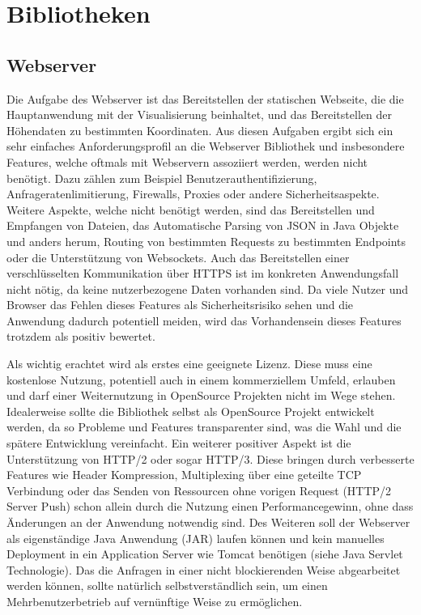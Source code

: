 
\section{Bibliotheken}

\subsection{Webserver}
Die Aufgabe des Webserver ist das Bereitstellen der statischen Webseite, die die Hauptanwendung mit der Visualisierung beinhaltet, und das Bereitstellen der Höhendaten zu bestimmten Koordinaten. Aus diesen Aufgaben ergibt sich ein sehr einfaches Anforderungsprofil an die Webserver Bibliothek und insbesondere Features, welche oftmals mit Webservern assoziiert werden, werden nicht benötigt. Dazu zählen zum Beispiel Benutzerauthentifizierung, Anfrageratenlimitierung, Firewalls, Proxies oder andere Sicherheitsaspekte. Weitere Aspekte, welche nicht benötigt werden, sind das Bereitstellen und Empfangen von Dateien, das Automatische Parsing von JSON in Java Objekte und anders herum, Routing von bestimmten Requests zu bestimmten Endpoints oder die Unterstützung von Websockets. Auch das Bereitstellen einer verschlüsselten Kommunikation über HTTPS ist im konkreten Anwendungsfall nicht nötig, da keine nutzerbezogene Daten vorhanden sind. Da viele Nutzer und Browser das Fehlen dieses Features als Sicherheitsrisiko sehen und die Anwendung dadurch potentiell meiden, wird das Vorhandensein dieses Features trotzdem als positiv bewertet.

Als wichtig erachtet wird als erstes eine geeignete Lizenz. Diese muss eine kostenlose Nutzung, potentiell auch in einem kommerziellem Umfeld, erlauben und darf einer Weiternutzung in OpenSource Projekten nicht im Wege stehen. Idealerweise sollte die Bibliothek selbst als OpenSource Projekt entwickelt werden, da so Probleme und Features transparenter sind, was die Wahl und die spätere Entwicklung vereinfacht. Ein weiterer positiver Aspekt ist die Unterstützung von HTTP/2 oder sogar HTTP/3. Diese bringen durch verbesserte Features wie Header Kompression, Multiplexing über eine geteilte TCP Verbindung oder das Senden von Ressourcen ohne vorigen Request (HTTP/2 Server Push) schon allein durch die Nutzung einen Performancegewinn, ohne dass Änderungen an der Anwendung notwendig sind. Des Weiteren soll der Webserver als eigenständige Java Anwendung (JAR) laufen können und kein manuelles Deployment in ein Application Server wie Tomcat benötigen (siehe Java Servlet Technologie). Das die Anfragen in einer nicht blockierenden Weise abgearbeitet werden können, sollte natürlich selbstverständlich sein, um einen Mehrbenutzerbetrieb auf vernünftige Weise zu ermöglichen.

